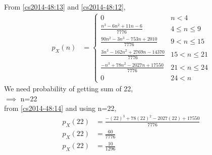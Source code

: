 From \eqref{cs2014-48:13} and \eqref{cs2014-48:12},
\begin{align}
p_X(n) &= 
\begin{cases}
0 & n < 4\\
\frac{n^3-6n^2+11n-6}{7776} &  4 \le n \le  9\\
\frac{90n^2-3n^3-753n+2010}{7776} & 9 < n \le 15\\
\frac{3n^3-162n^2+2769n-14370}{7776} & 15 < n \le 21\\
\frac{-n^3+78n^2-2027n+17550}{7776} & 21 < n \le 24\\
0 & 24 < n \label{cs2014-48:14}
\end{cases}
\end{align}
We need probability of getting sum of 22,\\$\implies$ n=22 \\from \eqref{cs2014-48:14} and using n=22,
\begin{align}
    p_X(22)&=\frac{-(22)^3+78(22)^2-2027(22)+17550}{7776}\\
    p_X(22)&=\frac{60}{7776}\\
    p_X(22)&=\frac{10}{1296}
\end{align}